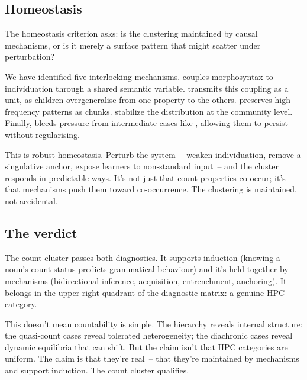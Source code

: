 \subsection{Homeostasis}
\label{sec:9:homeostasis}

The homeostasis criterion asks: is the clustering maintained by causal mechanisms, or is it merely a surface pattern that might scatter under perturbation?

We have identified five interlocking mechanisms.  couples morphosyntax to individuation through a shared semantic variable.  transmits this coupling as a unit, as children overgeneralise from one property to the others.  preserves high-frequency patterns as chunks.  stabilize the distribution at the community level. Finally,  bleeds pressure from intermediate cases like , allowing them to persist without regularising.

This is robust homeostasis. Perturb the system~-- weaken individuation, remove a singulative anchor, expose learners to non-standard input~-- and the cluster responds in predictable ways. It's not just that count properties co-occur; it's that mechanisms push them toward co-occurrence. The clustering is maintained, not accidental.

\subsection{The verdict}
\label{sec:9:verdict}

The count cluster passes both diagnostics. It supports induction (knowing a noun's count status predicts grammatical behaviour) and it's held together by mechanisms (bidirectional inference, acquisition, entrenchment, anchoring). It belongs in the upper-right quadrant of the diagnostic matrix: a genuine HPC category.

This doesn't mean countability is simple. The hierarchy reveals internal structure; the quasi-count cases reveal tolerated heterogeneity; the diachronic cases reveal dynamic equilibria that can shift. But the claim isn't that HPC categories are uniform. The claim is that they're real~-- that they're maintained by mechanisms and support induction. The count cluster qualifies.

